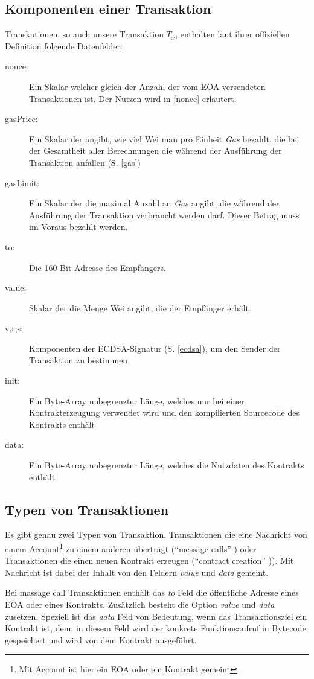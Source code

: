 \documentclass[runningheads]{llncs}
\begin{document}
\subsection{Komponenten einer Transaktion}
\label{komponenten}
Transkationen, so auch unsere Transaktion $T_x$, enthalten laut ihrer offiziellen Definition \cite[S. 4]{wood_ethereum/yellowpaper_2019} folgende Datenfelder:
\begin{description}
  \item[nonce:] Ein Skalar welcher gleich der Anzahl der vom EOA versendeten Transaktionen ist. Der Nutzen wird in \ref{nonce} erläutert.
  \item[gasPrice:] Ein Skalar der angibt, wie viel Wei man pro Einheit \textit{Gas} bezahlt, die bei der Gesamtheit aller Berechnungen die während der Ausführung der Transaktion anfallen (S. \ref{gas})
  \item[gasLimit:] Ein Skalar der die maximal Anzahl an \textit{Gas} angibt, die während der Ausführung der Transaktion verbraucht werden darf. Dieser Betrag muss im Voraus bezahlt werden.
  \item[to:] Die 160-Bit Adresse des Empfängers.
  \item[value:] Skalar der die Menge Wei angibt, die der Empfänger erhält.
  \item[v,r,s:] Komponenten der ECDSA-Signatur (S. \ref{ecdsa}), um den Sender der Transaktion zu bestimmen
  \item[init:] Ein Byte-Array unbegrenzter Länge, welches nur bei einer Kontrakterzeugung verwendet wird und den kompilierten Sourcecode des Kontrakts enthält
  \item[data:] Ein Byte-Array unbegrenzter Länge, welches die Nutzdaten des Kontrakts enthält
\end{description}


\subsection{Typen von Transaktionen}
Es gibt genau zwei Typen von Transaktion. Transaktionen die eine Nachricht von einem Account\footnote{Mit Account ist hier ein EOA oder ein Kontrakt gemeint} zu einem anderen überträgt ("`message calls"' \cite[S. 4]{wood_ethereum/yellowpaper_2019}) oder Transaktionen die einen neuen Kontrakt erzeugen ("`contract creation"' \cite[S. 4]{wood_ethereum/yellowpaper_2019})). Mit Nachricht ist dabei der Inhalt von den Feldern \textit{value} und \textit{data} gemeint.

Bei massage call Transaktionen enthält das \textit{to} Feld die öffentliche Adresse eines EOA oder eines Kontrakts. Zusätzlich besteht die Option \textit{value} und \textit{data} zusetzen. Speziell ist das \textit{data} Feld von Bedeutung, wenn das Transaktionsziel ein Kontrakt ist, denn in diesem Feld wird der konkrete
Funktionsaufruf in Bytecode gespeichert und wird von dem Kontrakt ausgeführt.
\end{document}
